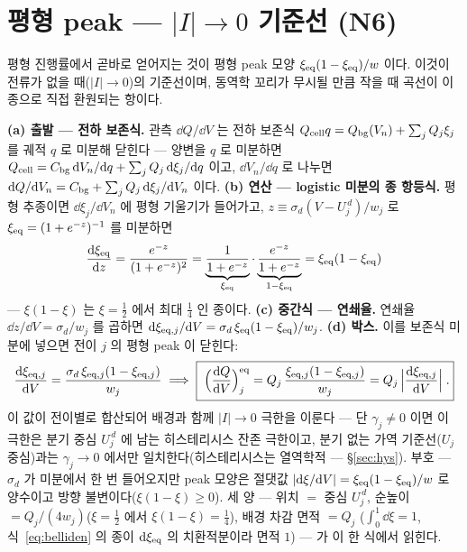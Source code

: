 \section{평형 peak --- $|I|\to0$ 기준선 (N6)}\label{sec:eqpeak}
평형 진행률에서 곧바로 얻어지는 것이 평형 peak 모양 $\xi_{\mathrm{eq}}(1-\xi_{\mathrm{eq}})/w$ 이다. 이것이 전류가 없을 때($|I|\to0$)의
기준선이며, 동역학 꼬리가 무시될 만큼 작을 때 곡선이 이 종으로 직접 환원되는 항이다.

\textbf{(a) 출발 --- 전하 보존식.} 관측 $\dd Q/\dd V$ 는 전하 보존식 $Q_{\mathrm{cell}} q=Q_{\mathrm{bg}}(V_n)+\sum_jQ_j\xi_j$ 를 궤적
$q$ 로 미분해 닫힌다 --- 양변을 $q$ 로 미분하면 $Q_{\mathrm{cell}}=C_{\mathrm{bg}}\,\mathrm{d} V_n/\mathrm{d} q+\sum_jQ_j\,\mathrm{d}\xi_j/\mathrm{d} q$ 이고,
$\dd V_n/\dd q$ 로 나누면 $\mathrm{d} Q/\mathrm{d} V_n=C_{\mathrm{bg}}+\sum_jQ_j\,\mathrm{d}\xi_j/\mathrm{d} V_n$ 이다. \textbf{(b) 연산 --- logistic
미분의 종 항등식.} 평형 추종이면 $\dd\xi_j/\dd V_n$ 에 평형 기울기가 들어가고, $z\equiv\sigma_d(V-U_j^{\,d})/w_j$ 로
$\xi_{\mathrm{eq}}=(1+e^{-z})^{-1}$ 를 미분하면
\begin{equation}
\frac{\mathrm{d}\xi_{\mathrm{eq}}}{\mathrm{d} z}=\frac{e^{-z}}{(1+e^{-z})^2}
=\underbrace{\frac{1}{1+e^{-z}}}_{\xi_{\mathrm{eq}}}\cdot\underbrace{\frac{e^{-z}}{1+e^{-z}}}_{1-\xi_{\mathrm{eq}}}
=\xi_{\mathrm{eq}}(1-\xi_{\mathrm{eq}})
\label{eq:belliden}
\end{equation}
--- $\xi(1-\xi)$ 는 $\xi=\tfrac12$ 에서 최대 $\tfrac14$ 인 종이다. \textbf{(c) 중간식 --- 연쇄율.} 연쇄율
$\dd z/\dd V=\sigma_d/w_j$ 를 곱하면 $\mathrm{d}\xi_{\mathrm{eq},j}/\mathrm{d} V=\sigma_d\,\xi_{\mathrm{eq}}(1-\xi_{\mathrm{eq}})/w_j$. \textbf{(d) 박스.}
이를 보존식 미분에 넣으면 전이 $j$ 의 평형 peak 이 닫힌다:
\begin{equation}
\frac{\mathrm{d}\xi_{\mathrm{eq},j}}{\mathrm{d} V}=\frac{\sigma_d\,\xi_{\mathrm{eq},j}(1-\xi_{\mathrm{eq},j})}{w_j}
\;\Longrightarrow\;
\boxed{\;\Big(\frac{\mathrm{d} Q}{\mathrm{d} V}\Big)^{\mathrm{eq}}_j
=Q_j\,\frac{\xi_{\mathrm{eq},j}(1-\xi_{\mathrm{eq},j})}{w_j}
=Q_j\,\Big|\frac{\mathrm{d}\xi_{\mathrm{eq},j}}{\mathrm{d} V}\Big|\;.}
\label{eq:eqpeak}
\end{equation}
이 값이 전이별로 합산되어 배경과 함께 $|I|\to0$ 극한을 이룬다 --- 단 $\gamma_j\ne0$ 이면 이 극한은 분기
중심 $U_j^{\,d}$ 에 남는 히스테리시스 잔존 극한이고, 분기 없는 가역 기준선($U_j$ 중심)과는
$\gamma_j\to0$ 에서만 일치한다(히스테리시스는 열역학적 --- \S\ref{sec:hys}). 부호 --- $\sigma_d$ 가 미분에서 한 번 들어오지만 peak 모양은
절댓값 $|\mathrm{d}\xi/\mathrm{d} V|=\xi_{\mathrm{eq}}(1-\xi_{\mathrm{eq}})/w$ 로 양수이고 방향 불변이다($\xi(1-\xi)\ge0$). 세 양 --- 위치 $=$ 중심
$U_j^{\,d}$, 순높이 $=Q_j/(4w_j)$($\xi=\tfrac12$ 에서 $\xi(1-\xi)=\tfrac14$), 배경 차감 면적 $=Q_j$
($\int_0^1\dd\xi=1$, 식~\eqref{eq:belliden} 의 종이 $\mathrm{d}\xi_{\mathrm{eq}}$ 의 치환적분이라 면적 $1$) --- 가 이 한 식에서 읽힌다.

